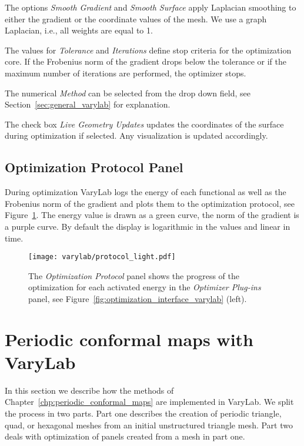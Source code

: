\documentclass[Thesis.tex]{subfiles}
\begin{document}
The options \emph{Smooth Gradient} and \emph{Smooth Surface} apply Laplacian smoothing to either the gradient or the coordinate values of the mesh. We use a graph Laplacian, i.e., all weights are equal to 1.

The values for \emph{Tolerance} and \emph{Iterations} define stop criteria for the optimization core. If the Frobenius norm of the gradient drops below the tolerance or if the maximum number of iterations are performed, the optimizer stops. 

The numerical \emph{Method} can be selected from the drop down field, see Section~\ref{sec:general_varylab} for explanation.

The check box \emph{Live Geometry Updates} updates the coordinates of the surface during optimization if selected. Any visualization is updated accordingly.

\subsection*{Optimization Protocol Panel}

During optimization {\sc VaryLab} logs the energy of each functional as well as the Frobenius norm of the gradient and plots them to the optimization protocol, see Figure~\ref{fig:protocol_interface_varylab}. The energy value is drawn as a green curve, the norm of the gradient is a purple curve. By default the display is logarithmic in the values and linear in time.

\begin{figure}
\begin{center}
\texttt{[image: varylab/protocol\_light.pdf]}
\caption{The \emph{Optimization Protocol} panel shows the progress of the optimization for each activated energy in the \emph{Optimizer Plug-ins} panel, see Figure~\ref{fig:optimization_interface_varylab} (left).}
\label{fig:protocol_interface_varylab}
\end{center}
\end{figure}

\section{Periodic conformal maps with {\sc VaryLab}}
\label{sec:periodic_varylab}
In this section we describe how the methods of Chapter~\ref{chp:periodic_conformal_maps} are implemented in {\sc VaryLab}. We split the process in two parts. Part one describes the creation of periodic triangle, quad, or hexagonal meshes from an initial unstructured triangle mesh. Part two deals with optimization of panels created from a mesh in part one.
\end{document}

